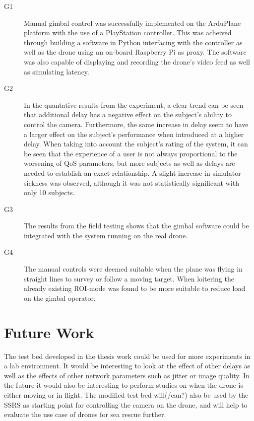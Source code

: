 \documentclass[nofilelist]{cslthse-msc}
\begin{document}
\begin{description}
   \item[G1]
   Manual gimbal control was successfully implemented on the ArduPlane platform with the use of a PlayStation controller. This was acheived through building a software in Python interfacing with the controller as well as the drone using an on-board Raspberry Pi as proxy. The software was also capable of displaying and recording the drone's video feed as well as simulating latency.

   \item[G2]
   In the quantative results from the experiment, a clear trend can be seen that additional delay has a negative effect on the subject's ability to control the camera. Furthermore, the same increase in delay seem to have a larger effect on the subject's performance when introduced at a higher delay. When taking into account the subject's rating of the system, it can be seen that the experience of a user is not always proportional to the worsening of QoS parameters, but more subjects as well as delays are needed to establish an exact relationship. A slight increase in simulator sickness was observed, although it was not statistically significant with only 10 subjects.

   \item[G3] 
   The results from the field testing shows that the gimbal software could be integrated with the system running on the real drone.

   \item[G4]
   The manual controls were deemed suitable when the plane was flying in straight lines to survey or follow a moving target. When loitering the already existing ROI-mode was found to be more suitable to reduce load on the gimbal operator.

\end{description}

\chapter{Future Work}
The test bed developed in the thesis work could be used for more experiments in a lab environment. It would be interesting to look at the effect of other delays as well as the effects of other network parameters such as jitter or image quality. In the future it would also be interesting to perform studies on when the drone is either moving or in flight.
The modified test bed will(/can?) also be used by the SSRS as starting point for controlling the camera on the drone, and will help to evaluate the use case of drones for sea rescue further.

{}
\end{document}
